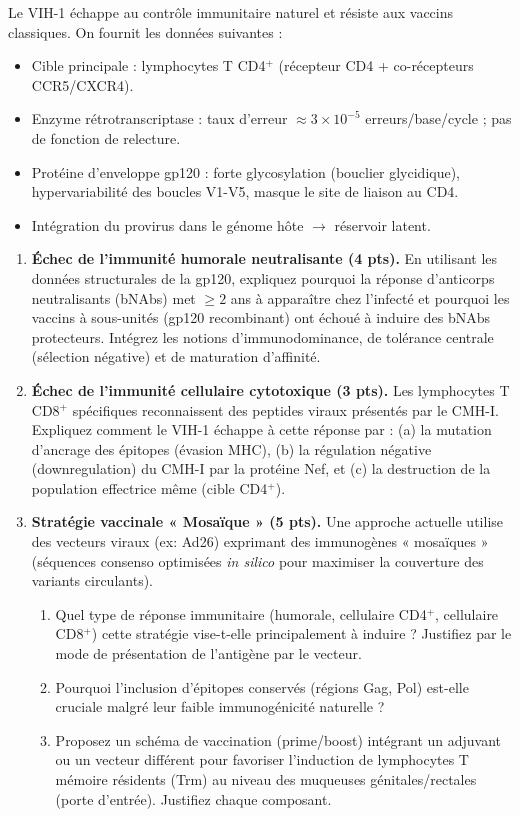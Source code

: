 \documentclass[11pt]{article}
\begin{document}
\begin{exercice}
Le VIH-1 échappe au contrôle immunitaire naturel et résiste aux vaccins classiques. On fournit les données suivantes :
\begin{itemize}
    \item Cible principale : lymphocytes T CD4$^+$ (récepteur CD4 + co-récepteurs CCR5/CXCR4).
    \item Enzyme rétrotranscriptase : taux d'erreur $\approx 3 \times 10^{-5}$ erreurs/base/cycle ; pas de fonction de relecture.
    \item Protéine d'enveloppe gp120 : forte glycosylation (bouclier glycidique), hypervariabilité des boucles V1-V5, masque le site de liaison au CD4.
    \item Intégration du provirus dans le génome hôte $\rightarrow$ réservoir latent.
\end{itemize}

\begin{enumerate}
    \item \textbf{Échec de l'immunité humorale neutralisante (4 pts).} En utilisant les données structurales de la gp120, expliquez pourquoi la réponse d'anticorps neutralisants (bNAbs) met $\ge 2$ ans à apparaître chez l'infecté et pourquoi les vaccins à sous-unités (gp120 recombinant) ont échoué à induire des bNAbs protecteurs. Intégrez les notions d'immunodominance, de tolérance centrale (sélection négative) et de maturation d'affinité.
    
    \item \textbf{Échec de l'immunité cellulaire cytotoxique (3 pts).} Les lymphocytes T CD8$^+$ spécifiques reconnaissent des peptides viraux présentés par le CMH-I. Expliquez comment le VIH-1 échappe à cette réponse par : (a) la mutation d'ancrage des épitopes (évasion MHC), (b) la régulation négative (downregulation) du CMH-I par la protéine Nef, et (c) la destruction de la population effectrice même (cible CD4$^+$).
    
    \item \textbf{Stratégie vaccinale « Mosaïque » (5 pts).} Une approche actuelle utilise des vecteurs viraux (ex: Ad26) exprimant des immunogènes « mosaïques » (séquences consenso optimisées \textit{in silico} pour maximiser la couverture des variants circulants).
    \begin{enumerate}
        \item Quel type de réponse immunitaire (humorale, cellulaire CD4$^+$, cellulaire CD8$^+$) cette stratégie vise-t-elle principalement à induire ? Justifiez par le mode de présentation de l'antigène par le vecteur.
        \item Pourquoi l'inclusion d'épitopes conservés (régions Gag, Pol) est-elle cruciale malgré leur faible immunogénicité naturelle ?
        \item Proposez un schéma de vaccination (prime/boost) intégrant un adjuvant ou un vecteur différent pour favoriser l'induction de lymphocytes T mémoire résidents (Trm) au niveau des muqueuses génitales/rectales (porte d'entrée). Justifiez chaque composant.
    \end{enumerate}
    

\end{enumerate}
\end{exercice}
\end{document}
